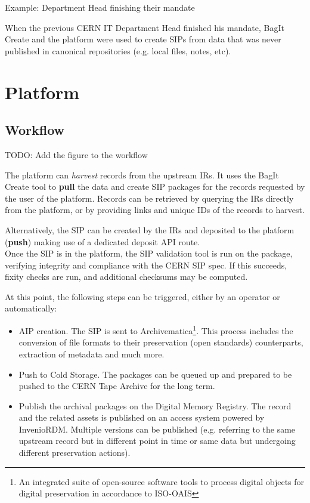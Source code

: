 \documentclass[11pt]{IEEEtran}
\begin{document}
\par{Example: Department Head finishing their mandate}

When the previous CERN IT Department Head finished his mandate, BagIt Create and the platform were used to create SIPs from data that was never published in canonical repositories (e.g. local files, notes, etc).


\section{Platform}

\subsection{Workflow}

TODO: Add the figure to the workflow

The platform can \textit{harvest} records from the upstream IRs. It uses the BagIt Create tool to \textbf{pull} the data and create SIP packages for the records requested by the user of the platform. Records can be retrieved by querying the IRs directly from the platform, or by providing links and unique IDs of the records to harvest.

Alternatively, the SIP can be created by the IRs and deposited to the platform (\textbf{push}) making use of a dedicated deposit API route.
\\

Once the SIP is in the platform, the SIP validation tool is run on the package, verifying integrity and compliance with the CERN SIP spec. If this succeeds, fixity checks are run, and additional checksums may be computed.

At this point, the following steps can be triggered, either by an operator or automatically:

\begin{itemize}
    \item AIP creation. The SIP is sent to Archivematica\footnote{An integrated suite\cite{Archivematica} of open-source software tools to process digital objects for digital preservation in accordance to ISO-OAIS}. This process includes the conversion of file formats to their preservation (open standards) counterparts, extraction of metadata and much more.
    \item Push to Cold Storage. The packages can be queued up and prepared to be pushed to the CERN Tape Archive for the long term.
    \item Publish the archival packages on the Digital Memory Registry. The record and the related assets is published on an access system powered by InvenioRDM. Multiple versions can be published (e.g. referring to the same upstream record but in different point in time or same data but undergoing different preservation actions).
\end{itemize}
\end{document}
